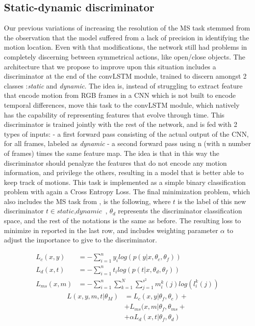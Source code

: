 \documentclass[10pt,twocolumn,hidelinks,letterpaper]{article}
\begin{document}
\subsection{Static-dynamic discriminator}

Our previous variations of increasing the resolution of the MS task stemmed from the observation that
the model suffered from a lack of precision in identifying the motion location. Even with that modifications, the network still had problems in completely discerning between symmetrical actions, like open/close objects. The architecture that we propose to improve upon this situation includes a discriminator at the end of the convLSTM module, trained to discern amongst 2 classes :\textit{static} and \textit{dynamic}. The idea is, instead of struggling to extract feature that encode motion from RGB frames
in a CNN which is not built to encode temporal differences, move this task to the convLSTM module,
which natively has the capability of representing features that evolve through time. This discriminator is trained jointly with the rest of the network, and is fed with 2 types of inputs:
- a first forward pass consisting of the actual output of the CNN, for all frames, labeled as \textit{dynamic}
- a second forward pass using n (with n number of frames) times the same feature map.
The idea is that in this way the discriminator should penalyze the features that do not encode
any motion information, and privilege the others, resulting in a model that is better able to
keep track of motions.
This task is implemented as a simple binary classification problem with again a Cross Entropy Loss.
The final minimization problem, which also includes the MS task from \cite{sparnet}, is the following,
where $t$ is the label of this new discriminator $t \in {\textit{static}, \textit{dynamic}}$ ,
$\theta_d$ represents the discriminator classification space, and the rest of the notations is the same as
before. The resulting loss to minimize in reported in the last row, and includes weighting parameter $\alpha$ to adjust the importance to give to the discriminator.

\begin{align*}
L_c(x,y) &= - \sum_{i=1}^{n} y_i log(p(y|x, \theta_c, \theta_f))\\
L_d(x,t) &= - \sum_{i=1}^{n} t_i log(p(t|x, \theta_d, \theta_f))\\
L_{ms}(x,m) &= - \sum_{i=1}^{n} \sum_{k=1}^{N} \sum_{j=1}^{s^2} m_i^k(j)log(l_i^k(j))
\end{align*}
\begin{align*}
L(x,y,m,t| \theta_M) &= L_c(x,y|\theta_f, \theta_c) + \\
&+ L_{ms}(x,m| \theta_f, \theta_{ms} + \\
&+ \alpha L_d(x,t| \theta_f, \theta_{d}  )
\end{align*}
\end{document}
